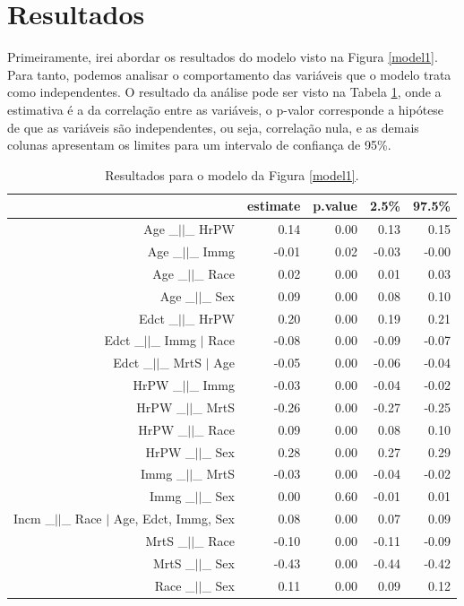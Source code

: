 \documentclass[11pt,letterpaper,twocolumn]{article}
\begin{document}
\section{Resultados}
\justify

Primeiramente, irei abordar os resultados do modelo visto na Figura \ref{model1}. Para tanto, podemos analisar o comportamento das variáveis que o modelo trata como independentes. O resultado da análise pode ser visto na Tabela \ref{r1m1}, onde a estimativa é a da correlação entre as variáveis, o p-valor corresponde a hipótese de que as variáveis são independentes, ou seja, correlação nula, e as demais colunas apresentam os limites para um intervalo de confiança de 95\%.
\begin{table}[ht]
    \centering
    \begin{tabular}{rrrrr}
        \hline
        & estimate & p.value & 2.5\% & 97.5\% \\ 
        \hline
        Age \_$||$\_ HrPW & 0.14 & 0.00 & 0.13 & 0.15 \\ 
        Age \_$||$\_ Immg & -0.01 & 0.02 & -0.03 & -0.00 \\ 
        Age \_$||$\_ Race & 0.02 & 0.00 & 0.01 & 0.03 \\ 
        Age \_$||$\_ Sex & 0.09 & 0.00 & 0.08 & 0.10 \\ 
        Edct \_$||$\_ HrPW & 0.20 & 0.00 & 0.19 & 0.21 \\ 
        Edct \_$||$\_ Immg $|$ Race & -0.08 & 0.00 & -0.09 & -0.07 \\ 
        Edct \_$||$\_ MrtS $|$ Age & -0.05 & 0.00 & -0.06 & -0.04 \\ 
        HrPW \_$||$\_ Immg & -0.03 & 0.00 & -0.04 & -0.02 \\ 
        HrPW \_$||$\_ MrtS & -0.26 & 0.00 & -0.27 & -0.25 \\ 
        HrPW \_$||$\_ Race & 0.09 & 0.00 & 0.08 & 0.10 \\ 
        HrPW \_$||$\_ Sex & 0.28 & 0.00 & 0.27 & 0.29 \\ 
        Immg \_$||$\_ MrtS & -0.03 & 0.00 & -0.04 & -0.02 \\ 
        Immg \_$||$\_ Sex & 0.00 & 0.60 & -0.01 & 0.01 \\ 
        Incm \_$||$\_ Race $|$ Age, Edct, Immg, Sex & 0.08 & 0.00 & 0.07 & 0.09 \\ 
        MrtS \_$||$\_ Race & -0.10 & 0.00 & -0.11 & -0.09 \\ 
        MrtS \_$||$\_ Sex & -0.43 & 0.00 & -0.44 & -0.42 \\ 
        Race \_$||$\_ Sex & 0.11 & 0.00 & 0.09 & 0.12 \\ 
        \hline
    \end{tabular}
    \caption{Resultados para o modelo da Figura \ref{model1}.}
    \label{r1m1}
\end{table}
\end{document}
